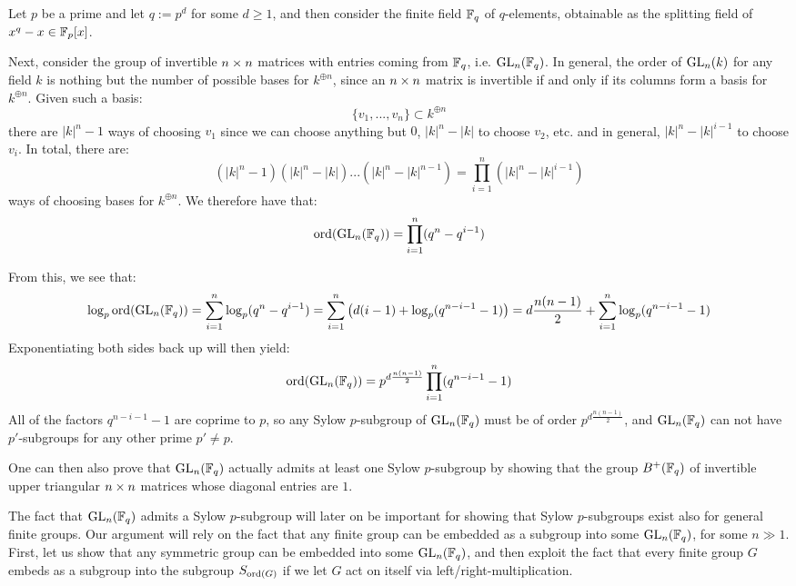         \begin{example}
            Let $p$ be a prime and let $q := p^d$ for some $d \geq 1$, and then consider the finite field $\mathbb{F}_q$ of $q$-elements, obtainable as the splitting field of $x^q - x \in \mathbb{F}_p[x]$.

            Next, consider the group of invertible $n \x n$ matrices with entries coming from $\mathbb{F}_q$, i.e. $\mathrm{GL}_n(\mathbb{F}_q)$. In general, the order of $\mathrm{GL}_n(k)$ for any field $k$ is nothing but the number of possible bases for $k^{\oplus n}$, since an $n \x n$ matrix is invertible if and only if its columns form a basis for $k^{\oplus n}$. Given such a basis:
                $$\{v_1, ..., v_n\} \subset k^{\oplus n}$$
            there are $|k|^n - 1$ ways of choosing $v_1$ since we can choose anything but $0$, $|k|^n - |k|$ to choose $v_2$, etc. and in general, $|k|^n - |k|^{i - 1}$ to choose $v_i$. In total, there are:
                $$(|k|^n - 1)(|k|^n - |k|) ... (|k|^n - |k|^{n - 1}) = \prod_{i = 1}^n (|k|^n - |k|^{i - 1})$$
            ways of choosing bases for $k^{\oplus n}$. We therefore have that:
                $$\operatorname{ord}( \mathrm{GL}_n(\mathbb{F}_q) ) = \prod_{i = 1}^n (q^n - q^{i - 1})$$

            From this, we see that:
                $$\log_p \operatorname{ord}( \mathrm{GL}_n(\mathbb{F}_q) ) = \sum_{i = 1}^n \log_p (q^n - q^{i - 1}) = \sum_{i = 1}^n \left( d(i - 1) + \log_p( q^{n - i - 1} - 1 ) \right) = d \frac{n(n - 1)}{2} + \sum_{i = 1}^n \log_p( q^{n - i - 1} - 1 )$$
            Exponentiating both sides back up will then yield:
                $$\operatorname{ord}( \mathrm{GL}_n(\mathbb{F}_q) ) = p^{ d \frac{n(n - 1)}{2} } \prod_{i = 1}^n (q^{n - i - 1} - 1)$$
            All of the factors $q^{n - i - 1} - 1$ are coprime to $p$, so any Sylow $p$-subgroup of $\mathrm{GL}_n(\mathbb{F}_q)$ must be of order $p^{ d\frac{n(n - 1)}{2} }$, and $\mathrm{GL}_n(\mathbb{F}_q)$ can not have $p'$-subgroups for any other prime $p' \not = p$.

            One can then also prove that $\mathrm{GL}_n(\mathbb{F}_q)$ actually admits at least one Sylow $p$-subgroup by showing that the group $B^+(\mathbb{F}_q)$ of invertible upper triangular $n \x n$ matrices whose diagonal entries are $1$.
        \end{example}
        The fact that $\mathrm{GL}_n(\mathbb{F}_q)$ admits a Sylow $p$-subgroup will later on be important for showing that Sylow $p$-subgroups exist also for general finite groups. Our argument will rely on the fact that any finite group can be embedded as a subgroup into some $\mathrm{GL}_n(\mathbb{F}_q)$, for some $n \gg 1$. First, let us show that any symmetric group can be embedded into some $\mathrm{GL}_n(\mathbb{F}_q)$, and then exploit the fact that every finite group $G$ embeds as a subgroup into the subgroup $S_{\operatorname{ord}(G)}$ if we let $G$ act on itself via left/right-multiplication.

